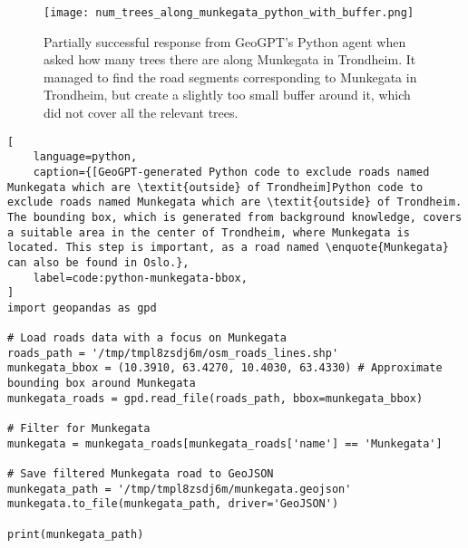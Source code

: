 \begin{figure}[htbp]
    \centering
    \texttt{[image: num\_trees\_along\_munkegata\_python\_with\_buffer.png]}
    \caption[Partially successful response from GeoGPT's Python agent when asked how many trees there are along Munkegata in Trondheim]{Partially successful response from GeoGPT's Python agent when asked how many trees there are along Munkegata in Trondheim. It managed to find the road segments corresponding to Munkegata in Trondheim, but create a slightly too small buffer around it, which did not cover all the relevant trees.}
    \label{fig:trees-along-munkegata-python-partial-success}
\end{figure}

\FloatBarrier

\begin{lstlisting}[
    language=python,
    caption={[GeoGPT-generated Python code to exclude roads named Munkegata which are \textit{outside} of Trondheim]Python code to exclude roads named Munkegata which are \textit{outside} of Trondheim. The bounding box, which is generated from background knowledge, covers a suitable area in the center of Trondheim, where Munkegata is located. This step is important, as a road named \enquote{Munkegata} can also be found in Oslo.},
    label=code:python-munkegata-bbox,
]
import geopandas as gpd

# Load roads data with a focus on Munkegata
roads_path = '/tmp/tmpl8zsdj6m/osm_roads_lines.shp'
munkegata_bbox = (10.3910, 63.4270, 10.4030, 63.4330) # Approximate bounding box around Munkegata
munkegata_roads = gpd.read_file(roads_path, bbox=munkegata_bbox)

# Filter for Munkegata
munkegata = munkegata_roads[munkegata_roads['name'] == 'Munkegata']

# Save filtered Munkegata road to GeoJSON
munkegata_path = '/tmp/tmpl8zsdj6m/munkegata.geojson'
munkegata.to_file(munkegata_path, driver='GeoJSON')

print(munkegata_path)
\end{lstlisting}

